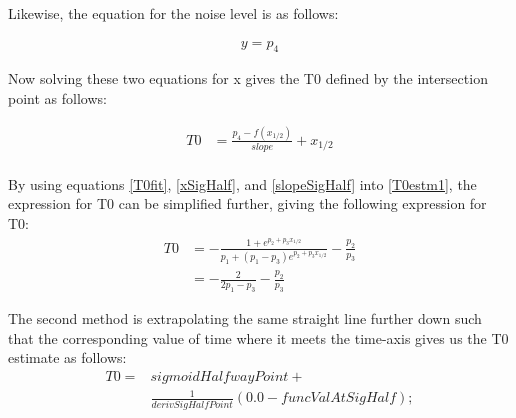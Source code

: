 \documentclass[12pt,epsfig]{article}
\begin{document}
Likewise, the equation for the noise level is as follows:

\begin{equation}
\label{eqNoiseLevel}
\begin{aligned}
  y = p_4
\end{aligned}
\end{equation}

Now solving these two equations for x gives the T0 defined by the intersection point as follows:

\begin{equation}
\label{T0estm1}
\begin{aligned}
  T0   & =  \frac{p_4 - f(x_{1/2})}{slope} + x_{1/2} \\
\end{aligned}
\end{equation}

By using equations \ref{T0fit}, \ref{xSigHalf}, and \ref{slopeSigHalf} into \ref{T0estm1}, the expression for T0 can be simplified further, giving
the following expression for T0:
\begin{equation}
\label{T0estm2}
\begin{aligned}
  T0   & = - \frac{1 + e^{p_2 + p_3 x_{1/2}}}{p_1 + (p_1 - p_3) e^{p_2 + p_3 x_{1/2}}} - \frac{p_2}{p_3}\\
       & = - \frac{2}{2p_1  - p_3} - \frac{p_2}{p_3}
\end{aligned}
\end{equation}


The second method is extrapolating the same straight line further down such that the corresponding value of
time where it meets the time-axis gives us the T0 estimate as follows:
\begin{equation}
\label{T0estm2n}
\begin{aligned}
   T0  =    &  sigmoidHalfwayPoint + \\
            & \frac{1}{derivSigHalfPoint} (0.0 - funcValAtSigHalf);
\end{aligned}
\end{equation}

\end{document}
